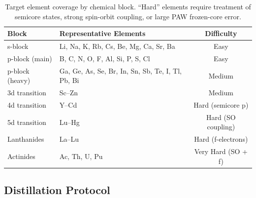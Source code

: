 \documentclass[11pt,a4paper]{article}
\theoremstyle{definition}
\begin{document}
\begin{table}[htbp]
\centering
\caption{Target element coverage by chemical block. ``Hard'' elements require treatment of semicore states, strong spin-orbit coupling, or large PAW frozen-core error.}
\label{tab:element_coverage}
\begin{tabular}{llc}
\toprule
Block & Representative Elements & Difficulty \\
\midrule
s-block & Li, Na, K, Rb, Cs, Be, Mg, Ca, Sr, Ba & Easy \\
p-block (main) & B, C, N, O, F, Al, Si, P, S, Cl & Easy \\
p-block (heavy) & Ga, Ge, As, Se, Br, In, Sn, Sb, Te, I, Tl, Pb, Bi & Medium \\
3d transition & Sc--Zn & Medium \\
4d transition & Y--Cd & Hard (semicore p) \\
5d transition & Lu--Hg & Hard (SO coupling) \\
Lanthanides & La--Lu & Hard (f-electrons) \\
Actinides & Ac, Th, U, Pu & Very Hard (SO + f) \\
\bottomrule
\end{tabular}
\end{table}

\subsection{Distillation Protocol}
\end{document}
